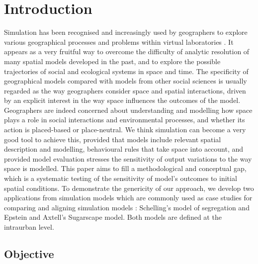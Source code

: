 \documentclass[Afour,sageh,times]{sagej}
\begin{document}

\maketitle




\section{Introduction}

Simulation has been recognised and increasingly used by geographers to explore various geographical processes and problems within virtual laboratories \citep{Quesneletal2009} . It appears as a very fruitful way to overcome the difficulty of analytic resolution of many spatial models developed in the past, and to explore the possible trajectories of social and ecological systems in space and time. The specificity of geographical models compared with models from other social sciences is usually regarded as the way geographers consider space and spatial interactions, driven by an explicit interest in the way space influences the outcomes of the model. Geographers are indeed concerned about understanding and modelling how space plays a role in social interactions and environmental processes, and whether its action is placed-based or place-neutral. We think simulation can become a very good tool to achieve this, provided that models include relevant spatial description and modelling, behavioural rules that take space into account, and provided model evaluation stresses the sensitivity of output variations to the way space is modelled. This paper aims to fill a methodological and conceptual gap, which is a systematic testing of the sensitivity of model's outcomes to initial spatial conditions. To demonstrate the genericity of our approach, we develop two applications from simulation models which are commonly used as case studies for comparing and aligning simulation models \citep{Axtelletal1996}: Schelling's model of segregation and Epstein and Axtell's Sugarscape model. Both models are defined at the intraurban level.

\subsection{Objective}
\end{document}
